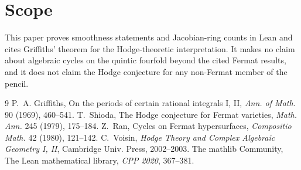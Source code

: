 \documentclass[11pt]{article}
\theoremstyle{definition}\newtheorem{definition}[theorem]{Definition}\newtheorem{remark}[theorem]{Remark}
\begin{document}
\section*{Scope}
This paper proves smoothness statements and Jacobian-ring counts in Lean and cites Griffiths' theorem for
the Hodge-theoretic interpretation. It makes no claim about algebraic cycles on the quintic fourfold beyond
the cited Fermat results, and it does not claim the Hodge conjecture for any non-Fermat member of the pencil.

\begin{thebibliography}{9}
 P.~A. Griffiths, On the periods of certain rational integrals I, II, \emph{Ann. of Math.} 90 (1969), 460--541.
 T.~Shioda, The Hodge conjecture for Fermat varieties, \emph{Math. Ann.} 245 (1979), 175--184.
 Z.~Ran, Cycles on Fermat hypersurfaces, \emph{Compositio Math.} 42 (1980), 121--142.
 C.~Voisin, \emph{Hodge Theory and Complex Algebraic Geometry I, II}, Cambridge Univ. Press, 2002--2003.
 The mathlib Community, The Lean mathematical library, \emph{CPP 2020}, 367--381.
\end{thebibliography}
\end{document}
